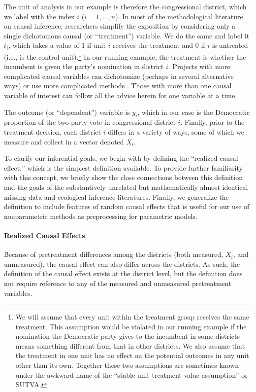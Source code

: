 \documentclass[11pt,titlepage]{article}
\begin{document}
The unit of analysis in our example is therefore the congressional
district, which we label with the index $i$ ($i=1,\dots,n$).  In most
of the methodological literature on causal inference, researchers
simplify the exposition by considering only a single dichotomous
causal (or ``treatment'') variable.  We do the same and label it
$t_i$, which takes a value of 1 if unit $i$ receives the treatment and
0 if $i$ is untreated (i.e., is the control unit).\footnote{We will
  assume that every unit within the treatment group receives the same
  treatment.  This assumption would be violated in our running example
  if the nomination the Democratic party gives to the incumbent in
  some districts means something different from that in other
  districts.  We also assume that the treatment in one unit has no
  effect on the potential outcomes in any unit other than its own.
  Together these two assumptions are sometimes known under the awkward
  name of the ``stable unit treatment value assumption'' or SUTVA.}
In our running example, the treatment is whether the incumbent is
given the party's nomination in district $i$.  Projects with more
complicated causal variables can dichotomize (perhaps in several
alternative ways) or use more complicated methods \citep{ImaDyk03}.
Those with more than one causal variable of interest can follow all
the advice herein for one variable at a time.

The outcome (or ``dependent'') variable is $y_i$, which in our case is
the Democratic proportion of the two-party vote in congressional
district $i$.  Finally, prior to the treatment decision, each district
$i$ differs in a variety of ways, some of which we measure and collect
in a vector denoted $X_i$.

To clarify our inferential goals, we begin with by defining the
``realized causal effect,'' which is the simplest definition
available.  To provide further familiarity with this concept, we
briefly show the close connections between this definition and the
goals of the substantively unrelated but mathematically almost
identical missing data and ecological inference literatures.  Finally,
we generalize the definition to include features of random causal
effects that is useful for our use of nonparametric methods as
preprocessing for parametric models.

\paragraph{Realized Causal Effects}
Because of pretreatment differences among the districts (both
measured, $X_i$, and unmeasured), the causal effect can also differ
across the districts.  As such, the definition of the causal effect
exists at the district level, but the definition does not require
reference to any of the measured and unmeasured pretreatment
variables.
\end{document}
